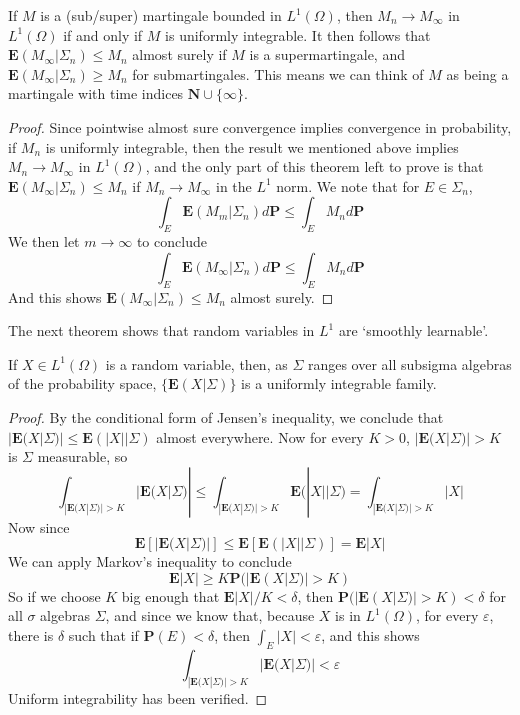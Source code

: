 \begin{corollary}
    If $M$ is a (sub/super) martingale bounded in $L^1(\Omega)$, then $M_n \to M_\infty$ in $L^1(\Omega)$ if and only if $M$ is uniformly integrable. It then follows that $\mathbf{E}(M_\infty|\Sigma_n) \leq M_n$ almost surely if $M$ is a supermartingale, and $\mathbf{E}(M_\infty|\Sigma_n) \geq M_n$ for submartingales. This means we can think of $M$ as being a martingale with time indices $\mathbf{N} \cup \{ \infty \}$.
\end{corollary}
\begin{proof}
    Since pointwise almost sure convergence implies convergence in probability, if $M_n$ is uniformly integrable, then the result we mentioned above implies $M_n \to M_\infty$ in $L^1(\Omega)$, and the only part of this theorem left to prove is that $\mathbf{E}(M_\infty|\Sigma_n) \leq M_n$ if $M_n \to M_\infty$ in the $L^1$ norm. We note that for $E \in \Sigma_n$,
    \[ \int_E \mathbf{E}(M_m|\Sigma_n) d\mathbf{P} \leq \int_E M_n d\mathbf{P}  \]
    We then let $m \to \infty$ to conclude
    \[ \int_E \mathbf{E}(M_\infty|\Sigma_n) d\mathbf{P} \leq \int_E M_n d\mathbf{P} \]
    And this shows $\mathbf{E}(M_\infty|\Sigma_n) \leq M_n$ almost surely.
\end{proof}

The next theorem shows that random variables in $L^1$ are `smoothly learnable'.

\begin{lemma}
    If $X \in L^1(\Omega)$ is a random variable, then, as $\Sigma$ ranges over all subsigma algebras of the probability space, $\{ \mathbf{E}(X|\Sigma)  \}$ is a uniformly integrable family.
\end{lemma}
\begin{proof}
    By the conditional form of Jensen's inequality, we conclude that $|\mathbf{E}(X|\Sigma)| \leq \mathbf{E}(|X| | \Sigma)$ almost everywhere. Now for every $K > 0$, $|\mathbf{E}(X|\Sigma)| > K$ is $\Sigma$ measurable, so
    \[ \int_{|\mathbf{E}(X|\Sigma)| > K} |\mathbf{E}(X|\Sigma)| \leq \int_{|\mathbf{E}(X | \Sigma)| > K} \mathbf{E}(|X| | \Sigma) = \int_{|\mathbf{E}(X|\Sigma)| > K} |X|  \]
    Now since
    \[ \mathbf{E} \left[ |\mathbf{E}(X|\Sigma)| \right] \leq \mathbf{E} \left[ \mathbf{E}(|X| | \Sigma) \right] = \mathbf{E} |X| \]
    We can apply Markov's inequality to conclude
    \[ \mathbf{E} |X| \geq K \mathbf{P}(|\mathbf{E}(X|\Sigma)| > K) \]
    So if we choose $K$ big enough that $\mathbf{E} |X|/K < \delta$, then $\mathbf{P}(|\mathbf{E}(X|\Sigma)| > K) < \delta$ for all $\sigma$ algebras $\Sigma$, and since we know that, because $X$ is in $L^1(\Omega)$, for every $\varepsilon$, there is $\delta$ such that if $\mathbf{P}(E) < \delta$, then $\int_E |X| < \varepsilon$, and this shows
    \[ \int_{|\mathbf{E}(X|\Sigma)| > K} |\mathbf{E}(X|\Sigma)| < \varepsilon \]
    Uniform integrability has been verified.
\end{proof}

